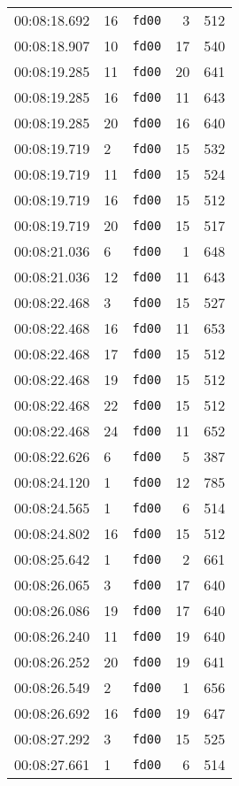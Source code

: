\documentclass{article}
\begin{document}
\begin{longtable}{lllrr}
00:08:18.692 & 16 & \texttt{fd00} & 3 & 512 \\
00:08:18.907 & 10 & \texttt{fd00} & 17 & 540 \\
00:08:19.285 & 11 & \texttt{fd00} & 20 & 641 \\
00:08:19.285 & 16 & \texttt{fd00} & 11 & 643 \\
00:08:19.285 & 20 & \texttt{fd00} & 16 & 640 \\
00:08:19.719 & 2 & \texttt{fd00} & 15 & 532 \\
00:08:19.719 & 11 & \texttt{fd00} & 15 & 524 \\
00:08:19.719 & 16 & \texttt{fd00} & 15 & 512 \\
00:08:19.719 & 20 & \texttt{fd00} & 15 & 517 \\
00:08:21.036 & 6 & \texttt{fd00} & 1 & 648 \\
00:08:21.036 & 12 & \texttt{fd00} & 11 & 643 \\
00:08:22.468 & 3 & \texttt{fd00} & 15 & 527 \\
00:08:22.468 & 16 & \texttt{fd00} & 11 & 653 \\
00:08:22.468 & 17 & \texttt{fd00} & 15 & 512 \\
00:08:22.468 & 19 & \texttt{fd00} & 15 & 512 \\
00:08:22.468 & 22 & \texttt{fd00} & 15 & 512 \\
00:08:22.468 & 24 & \texttt{fd00} & 11 & 652 \\
00:08:22.626 & 6 & \texttt{fd00} & 5 & 387 \\
00:08:24.120 & 1 & \texttt{fd00} & 12 & 785 \\
00:08:24.565 & 1 & \texttt{fd00} & 6 & 514 \\
00:08:24.802 & 16 & \texttt{fd00} & 15 & 512 \\
00:08:25.642 & 1 & \texttt{fd00} & 2 & 661 \\
00:08:26.065 & 3 & \texttt{fd00} & 17 & 640 \\
00:08:26.086 & 19 & \texttt{fd00} & 17 & 640 \\
00:08:26.240 & 11 & \texttt{fd00} & 19 & 640 \\
00:08:26.252 & 20 & \texttt{fd00} & 19 & 641 \\
00:08:26.549 & 2 & \texttt{fd00} & 1 & 656 \\
00:08:26.692 & 16 & \texttt{fd00} & 19 & 647 \\
00:08:27.292 & 3 & \texttt{fd00} & 15 & 525 \\
00:08:27.661 & 1 & \texttt{fd00} & 6 & 514 \\

\end{longtable}
\end{document}
